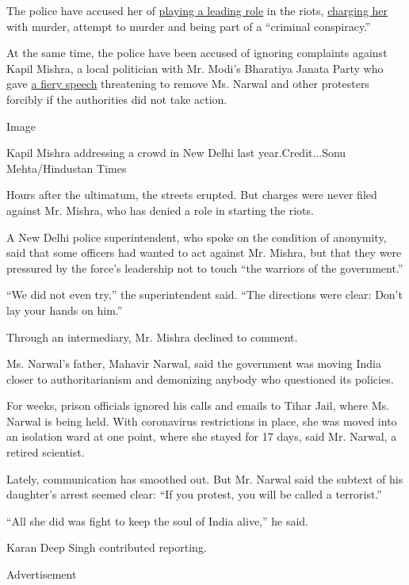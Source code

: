 The police have accused her of
\href{https://thewire.in/rights/pinjra-tods-devangana-kalita-natasha-narwal-denied-bail-again-in-delhi-riots-case}{playing
a leading role} in the riots,
\href{https://www.livelaw.in/pdf_upload/pdf_upload-376649.pdf}{charging
her} with murder, attempt to murder and being part of a ``criminal
conspiracy.''

At the same time, the police have been accused of ignoring complaints
against Kapil Mishra, a local politician with Mr. Modi's Bharatiya
Janata Party who gave
\href{https://www.nytimes3xbfgragh.onion/2020/02/26/world/asia/delhi-riots-kapil-mishra.html}{a
fiery speech} threatening to remove Ms. Narwal and other protesters
forcibly if the authorities did not take action.

Image

Kapil Mishra addressing a crowd in New Delhi last year.Credit...Sonu
Mehta/Hindustan Times

Hours after the ultimatum, the streets erupted. But charges were never
filed against Mr. Mishra, who has denied a role in starting the riots.

A New Delhi police superintendent, who spoke on the condition of
anonymity, said that some officers had wanted to act against Mr. Mishra,
but that they were pressured by the force's leadership not to touch
``the warriors of the government.''

``We did not even try,'' the superintendent said. ``The directions were
clear: Don't lay your hands on him.''

Through an intermediary, Mr. Mishra declined to comment.

Ms. Narwal's father, Mahavir Narwal, said the government was moving
India closer to authoritarianism and demonizing anybody who questioned
its policies.

For weeks, prison officials ignored his calls and emails to Tihar Jail,
where Ms. Narwal is being held. With coronavirus restrictions in place,
she was moved into an isolation ward at one point, where she stayed for
17 days, said Mr. Narwal, a retired scientist.

Lately, communication has smoothed out. But Mr. Narwal said the subtext
of his daughter's arrest seemed clear: ``If you protest, you will be
called a terrorist.''

``All she did was fight to keep the soul of India alive,'' he said.

Karan Deep Singh contributed reporting.

Advertisement

